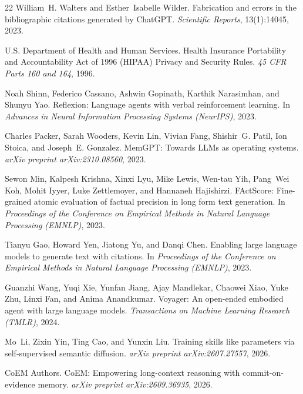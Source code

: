 \documentclass[11pt,a4paper]{article}
\begin{document}
\begin{thebibliography}{22}
William~H. Walters and Esther~Isabelle Wilder.
\newblock Fabrication and errors in the bibliographic citations generated by ChatGPT.
\newblock \emph{Scientific Reports}, 13(1):14045, 2023.

U.S. Department of Health and Human Services.
\newblock Health Insurance Portability and Accountability Act of 1996 (HIPAA) Privacy and Security Rules.
\newblock \emph{45 CFR Parts 160 and 164}, 1996.

Noah Shinn, Federico Cassano, Ashwin Gopinath, Karthik Narasimhan, and Shunyu Yao.
\newblock Reflexion: Language agents with verbal reinforcement learning.
\newblock In \emph{Advances in Neural Information Processing Systems (NeurIPS)}, 2023.

Charles Packer, Sarah Wooders, Kevin Lin, Vivian Fang, Shishir~G. Patil, Ion Stoica, and Joseph~E. Gonzalez.
\newblock MemGPT: Towards LLMs as operating systems.
\newblock \emph{arXiv preprint arXiv:2310.08560}, 2023.

Sewon Min, Kalpesh Krishna, Xinxi Lyu, Mike Lewis, Wen-tau Yih, Pang~Wei Koh, Mohit Iyyer, Luke Zettlemoyer, and Hannaneh Hajishirzi.
\newblock FActScore: Fine-grained atomic evaluation of factual precision in long form text generation.
\newblock In \emph{Proceedings of the Conference on Empirical Methods in Natural Language Processing (EMNLP)}, 2023.

Tianyu Gao, Howard Yen, Jiatong Yu, and Danqi Chen.
\newblock Enabling large language models to generate text with citations.
\newblock In \emph{Proceedings of the Conference on Empirical Methods in Natural Language Processing (EMNLP)}, 2023.

Guanzhi Wang, Yuqi Xie, Yunfan Jiang, Ajay Mandlekar, Chaowei Xiao, Yuke Zhu, Linxi Fan, and Anima Anandkumar.
\newblock Voyager: An open-ended embodied agent with large language models.
\newblock \emph{Transactions on Machine Learning Research (TMLR)}, 2024.

Mo~Li, Zixin Yin, Ting Cao, and Yunxin Liu.
\newblock Training skills like parameters via self-supervised semantic diffusion.
\newblock \emph{arXiv preprint arXiv:2607.27557}, 2026.

CoEM Authors.
\newblock CoEM: Empowering long-context reasoning with commit-on-evidence memory.
\newblock \emph{arXiv preprint arXiv:2609.36935}, 2026.


\end{thebibliography}
\end{document}
